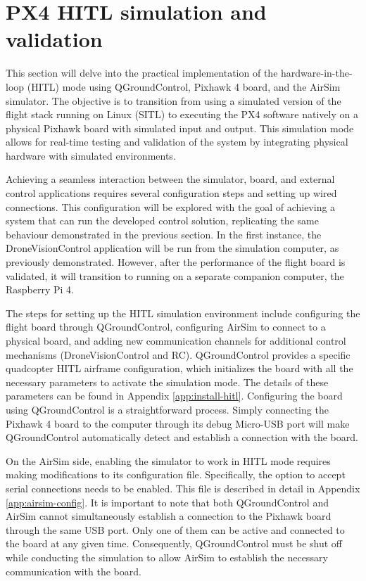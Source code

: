 \section{PX4 HITL simulation and validation}
\label{sec:test-4-hitl}


This section will delve into the practical implementation of the hardware-in-the-loop (HITL) mode using QGroundControl, Pixhawk 4 board, and the AirSim simulator. The objective is to transition from using a simulated version of the flight stack running on Linux (SITL) to executing the PX4 software natively on a physical Pixhawk board with simulated input and output. This simulation mode allows for real-time testing and validation of the system by integrating physical hardware with simulated environments. 

Achieving a seamless interaction between the simulator, board, and external control applications requires several configuration steps and setting up wired connections. This configuration will be explored with the goal of achieving a system that can run the developed control solution, replicating the same behaviour demonstrated in the previous section. In the first instance, the DroneVisionControl application will be run from the simulation computer, as previously demonstrated. However, after the performance of the flight board is validated, it will transition to running on a separate companion computer, the Raspberry Pi 4.


The steps for setting up the HITL simulation environment include configuring the flight board through QGroundControl, configuring AirSim to connect to a physical board, and adding new communication channels for additional control mechanisms (DroneVisionControl and RC).
QGroundControl provides a specific quadcopter HITL airframe configuration, which initializes the board with all the necessary parameters to activate the simulation mode. The details of these parameters can be found in Appendix \ref{app:install-hitl}. Configuring the board using QGroundControl is a straightforward process. Simply connecting the Pixhawk 4 board to the computer through its debug Micro-USB port will make QGroundControl automatically detect and establish a connection with the board.


On the AirSim side, enabling the simulator to work in HITL mode requires making modifications to its configuration file. Specifically, the option to accept serial connections needs to be enabled. This file is described in detail in Appendix \ref{app:airsim-config}.
It is important to note that both QGroundControl and AirSim cannot simultaneously establish a connection to the Pixhawk board through the same USB port. Only one of them can be active and connected to the board at any given time. Consequently, QGroundControl must be shut off while conducting the simulation to allow AirSim to establish the necessary communication with the board.


